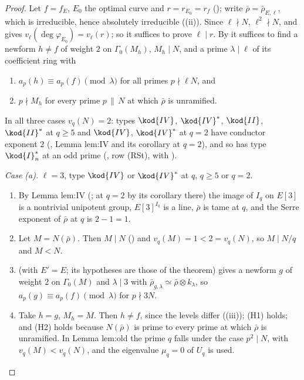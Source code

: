 \begin{proof}
Let $f=f_E$, $E_0$ the optimal curve and $r=r_{E_0}=r_f$ (); write $\bar\rho=\bar\rho_{E,\ell}$, which is irreducible, hence absolutely irreducible
((ii)). Since $\ell\nmid N$, $\ell^2\nmid N$, and  gives $v_\ell(\deg\varphi_{E_0})=v_\ell(r)$; so it suffices to prove $\ell\mid r$. By
 it suffices to find a newform $h\ne f$ of weight $2$ on $\Gamma_0(M_h)$, $M_h\mid N$, and a prime $\lambda\mid\ell$ of its coefficient ring with
\begin{enumerate}[label=(H\arabic*)]
\item $a_p(h)\equiv a_p(f)\pmod\lambda$ for all primes $p\nmid\ell N$, and
\item $p\nmid M_h$ for every prime $p\,\|\,N$ at which $\bar\rho$ is unramified.
\end{enumerate}
In all three cases $v_q(N)=2$: types $\kod{IV}$, $\kod{IV}^*$, $\kod{II}$, $\kod{II}^*$ at $q\ge5$ and $\kod{IV}$, $\kod{IV}^*$ at $q=2$ have conductor exponent $2$ (, Lemma lem:IV
and its corollary at $q=2$), and so has type $\kod{I}_n^*$ at an odd prime (, row (RSt), with ).

\emph{Case (a).} $\ell=3$, type $\kod{IV}$ or $\kod{IV}^*$ at $q$, $q\ge5$ or $q=2$.
\begin{enumerate}[label=(a\arabic*)]
\item By Lemma lem:IV (; at $q=2$ by its corollary there) the image of $I_q$ on $E[3]$ is a nontrivial unipotent group, $E[3]^{I_q}$ is a line, $\bar\rho$ is
tame at $q$, and the Serre exponent of $\bar\rho$ at $q$ is $2-1=1$.
\item Let $M=N(\bar\rho)$. Then $M\mid N$ () and $v_q(M)=1<2=v_q(N)$, so $M\mid N/q$ and $M<N$.
\item {} (with $E'=E$; its hypotheses are those of the theorem) gives a newform $g$ of weight $2$ on $\Gamma_0(M)$ and $\lambda\mid3$ with
$\bar\rho_{g,\lambda}\simeq\bar\rho\otimes k_\lambda$, so $a_p(g)\equiv a_p(f)\pmod\lambda$ for $p\nmid3N$.
\item Take $h=g$, $M_h=M$. Then $h\ne f$, since the levels differ ((iii)); (H1) holds; and (H2) holds because $N(\bar\rho)$ is prime to every prime at
which $\bar\rho$ is unramified. In Lemma lem:old the prime $q$ falls under the case $p^2\mid N$, with $v_q(M)<v_q(N)$, and the eigenvalue $\mu_q=0$ of $U_q$ is used.
\end{enumerate}


\end{proof}
